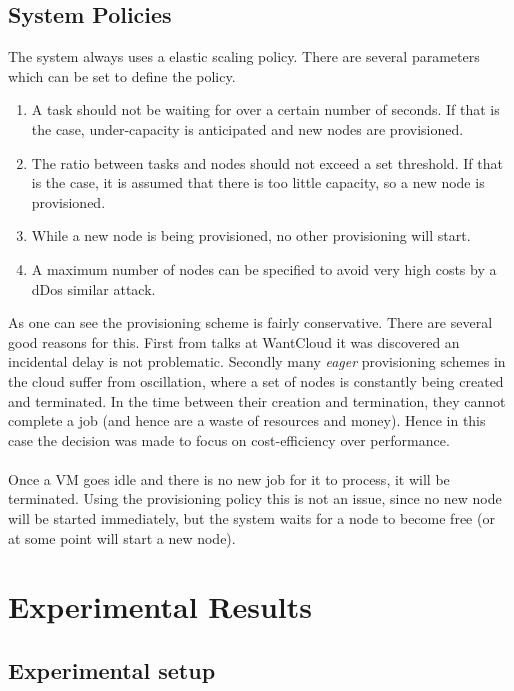 \documentclass[a4paper]{IEEEtran}
\begin{document}
\subsection{System Policies}

The system always uses a elastic scaling policy. There are several parameters which can be set to define the policy.

\begin{enumerate}
\item A task should not be waiting for over a certain number of seconds.
If that is the case, under-capacity is anticipated and new nodes are provisioned.
\item The ratio between tasks and nodes should not exceed a set threshold. 
If that is the case, it is assumed that there is too little capacity, so a new node is provisioned.
\item While a new node is being provisioned, no other provisioning will start.
\item A maximum number of nodes can be specified to avoid very high costs by a dDos similar attack.
\end{enumerate}

As one can see the provisioning scheme is fairly conservative.
There are several good reasons for this.
First from talks at WantCloud it was discovered an incidental delay is not problematic.
Secondly many \textit{eager} provisioning schemes in the cloud suffer from oscillation, where a set of nodes is constantly being created and terminated.
In the time between their creation and termination, they cannot complete a job (and hence are a waste of resources and money).
Hence in this case the decision was made to focus on cost-efficiency over performance.
\\
\\
Once a VM goes idle and there is no new job for it to process, it will be terminated.
Using the provisioning policy this is not an issue, since no new node will be started immediately, but the system waits for a node to become free (or at some point will start a new node).

\section{Experimental Results}

\subsection{Experimental setup}
\end{document}
